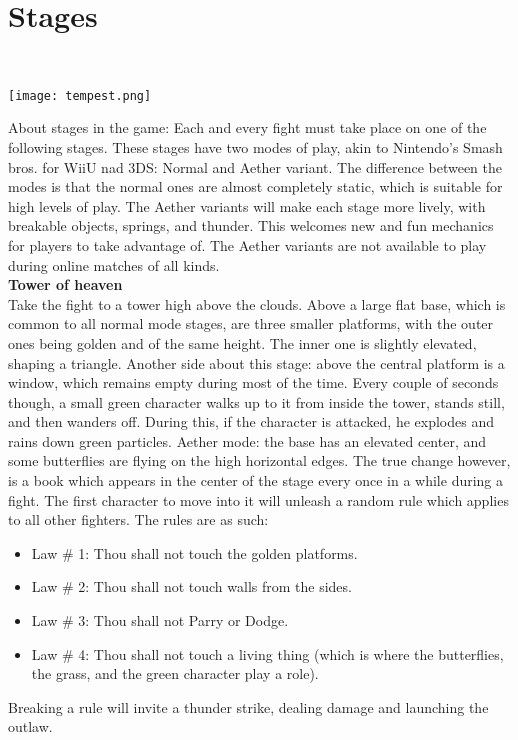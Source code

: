 \documentclass{article}
\begin{document}
\chapter{\textbf{Stages}}\\

\begin{center}
\texttt{[image: tempest.png]}
\end{center}

About stages in the game: Each and every fight must take place on one of the following stages. These stages have two modes of play, akin to Nintendo's Smash bros. for WiiU nad 3DS: Normal and Aether variant. The difference between the modes is that the normal ones are almost completely static, which is suitable for high levels of play. The Aether variants will make each stage more lively, with breakable objects, springs, and thunder. This welcomes new and fun mechanics for players to take advantage of. The Aether variants are not available to play during online matches of all kinds.\\

\textbf{Tower of heaven}\\
Take the fight to a tower high above the clouds. Above a large flat base, which is common to all normal mode stages, are three smaller platforms, with the outer ones being golden and of the same height. The inner one is slightly elevated, shaping a triangle. Another side about this stage: above the central platform is a window, which remains empty during most of the time. Every couple of seconds though, a small green character walks up to it from inside the tower, stands still, and then wanders off. During this, if the character is attacked, he explodes and rains down green particles.
Aether mode: the base has an elevated center, and some butterflies are flying on the high horizontal edges. The true change however, is a book which appears in the center of the stage every once in a while during a fight. The first character to move into it will unleash a random rule which applies to all other fighters. The rules are as such:\\
\begin{itemize}
\item Law # 1: Thou shall not touch the golden platforms.
\item Law # 2: Thou shall not touch walls from the sides.
\item Law # 3: Thou shall not Parry or Dodge.
\item Law # 4: Thou shall not touch a living thing (which is where the butterflies, the grass, and the green character play a role).
\end{itemize}
Breaking a rule will invite a thunder strike, dealing damage and launching the outlaw.\\
\end{document}
